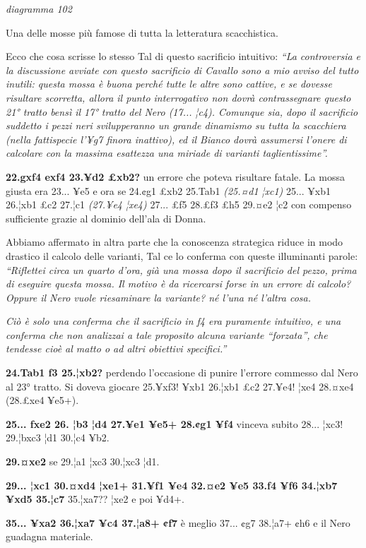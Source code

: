 \documentclass[
]{article}
\begin{document}
\emph{diagramma 102}

Una delle mosse più famose di tutta la letteratura scacchistica.

Ecco che cosa scrisse lo stesso Tal di questo sacrificio intuitivo:
\emph{``La controversia e la discussione avviate con questo sacrificio
di Cavallo sono a mio avviso del tutto inutili: questa mossa è buona
perché tutte le altre sono cattive, e se dovesse risultare scorretta,
allora il punto interrogativo non dovrà contrassegnare questo 21° tratto
bensì il 17° tratto del Nero (17... ¦c4). Comunque sia, dopo il
sacrificio suddetto i pezzi neri svilupperanno un grande dinamismo su
tutta la scacchiera (nella fattispecie l'¥g7 finora inattivo), ed il
Bianco dovrà assumersi l'onere di calcolare con la massima esattezza una
miriade di varianti taglientissime''.}

\textbf{22.gxf4 exf4 23.¥d2 £xb2?} un errore che poteva risultare
fatale. La mossa giusta era 23... ¥e5 e ora se 24.¢g1 £xb2 25.Tab1
\emph{(25.¤d1 ¦xc1)} 25... ¥xb1 26.¦xb1 £c2 27.¦c1 \emph{(27.¥e4 ¦xe4)}
27... £f5 28.£f3 £h5 29.¤e2 ¦c2 con compenso sufficiente grazie al
dominio dell'ala di Donna.

Abbiamo affermato in altra parte che la conoscenza strategica riduce in
modo drastico il calcolo delle varianti, Tal ce lo conferma con queste
illuminanti parole: \emph{``Riflettei circa un quarto d'ora, già una
mossa dopo il sacrificio del pezzo, prima di eseguire questa mossa. Il
motivo è da ricercarsi forse in un errore di calcolo? Oppure il Nero
vuole riesaminare la variante? né l'una né l'altra cosa.}

\emph{Ciò è solo una conferma che il sacrificio in f4 era puramente
intuitivo, e una conferma che non analizzai a tale proposito alcuna
variante ``forzata'', che tendesse cioè al matto o ad altri obiettivi
specifici.''}

\textbf{24.Tab1 f3 25.¦xb2?} perdendo l'occasione di punire l'errore
commesso dal Nero al 23° tratto. Si doveva giocare 25.¥xf3! ¥xb1 26.¦xb1
£c2 27.¥e4! ¦xe4 28.¤xe4 (28.£xe4 ¥e5+).

\textbf{25... fxe2 26. ¦b3 ¦d4 27.¥e1 ¥e5+ 28.¢g1 ¥f4} vinceva subito
28... ¦xc3! 29.¦bxc3 ¦d1 30.¦c4 ¥b2.

\textbf{29.¤xe2} se 29.¦a1 ¦xc3 30.¦xc3 ¦d1.

\textbf{29... ¦xc1 30.¤xd4 ¦xe1+ 31.¥f1 ¥e4 32.¤e2 ¥e5 33.f4 ¥f6 34.¦xb7
¥xd5 35.¦c7} 35.¦xa7?? ¦xe2 e poi ¥d4+.

\textbf{35... ¥xa2 36.¦xa7 ¥c4 37.¦a8+ ¢f7} è meglio 37... ¢g7 38.¦a7+
¢h6 e il Nero guadagna materiale.
\end{document}
